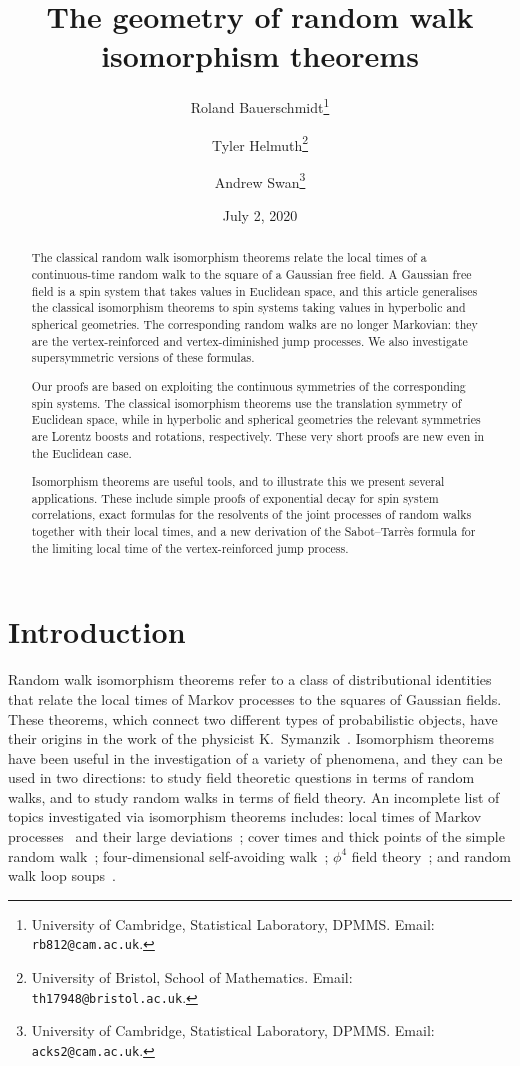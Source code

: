 \documentclass[11pt,a4paper]{article}
\author{Roland Bauerschmidt\thanks{University of Cambridge, Statistical Laboratory, DPMMS. Email: {\tt rb812@cam.ac.uk}.}
  \and Tyler Helmuth\thanks{University of Bristol, School of Mathematics. Email: {\tt th17948@bristol.ac.uk}.}
  \and Andrew Swan\thanks{University of Cambridge, Statistical Laboratory, DPMMS. Email: {\tt acks2@cam.ac.uk}.}
  }
\title{The geometry of random walk isomorphism theorems}
\date{July 2, 2020}
\begin{document}
\maketitle

\begin{abstract}
  The classical random walk isomorphism theorems relate the
  local times of a continuous-time random walk to the square of a
  Gaussian free field. A Gaussian free field is a spin system that
  takes values in Euclidean space, and this article generalises the
  classical isomorphism theorems to spin systems taking values in
  hyperbolic and spherical geometries. The corresponding random walks
  are no longer Markovian: they are the vertex-reinforced and
  vertex-diminished jump processes. We also investigate supersymmetric
  versions of these formulas.

  Our proofs are based on exploiting the continuous symmetries of the
  corresponding spin systems. The classical isomorphism theorems use
  the translation symmetry of Euclidean space, while in hyperbolic and
  spherical geometries the relevant symmetries are Lorentz boosts and
  rotations, respectively. These very short proofs are new even in the
  Euclidean case.

  Isomorphism theorems are useful tools, and to illustrate this we
  present several applications. These include simple proofs of
  exponential decay for spin system correlations, exact formulas for
  the resolvents of the joint processes of random walks together
  with their local times,
  and a new derivation of the Sabot--Tarr\`{e}s formula for
  the limiting local time of the vertex-reinforced jump process.
\end{abstract}

\setcounter{tocdepth}{1}
\tableofcontents

\section{Introduction}

Random walk isomorphism theorems refer to a class of
distributional identities that relate the local times of Markov
processes to the squares of Gaussian fields. These theorems, which
connect two different types of probabilistic objects, have their
origins in the work of the physicist K.\ Symanzik~\cite{Syma69}.
Isomorphism theorems have been useful in the
investigation of a variety of phenomena, and they can be used in
two directions: to study field theoretic questions in terms
of random walks, and to study random walks in terms of field
theory.  An incomplete list of topics
investigated via isomorphism theorems includes: local times of
Markov processes~\cite{MR2250510} and their large
deviations~\cite{MR1100240,MR2330973}; cover times and thick points of the
simple random walk~\cite{MR2912708,1809.04369,1903.04045};
four-dimensional self-avoiding walk~\cite{MR1143413,MR3339164};
$\phi^4$ field theory~\cite{MR719815,BrydgesHelmuthHolmes, MR643591};
and random walk loop soups~\cite{MR2932978, MR941982}.
\end{document}
